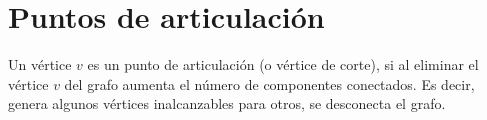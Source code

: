 
\section{Puntos de articulación}\label{articulation-points}
Un vértice \( v \) es un punto de articulación (o vértice de corte), si al eliminar el vértice \( v \) del grafo aumenta el número de componentes conectados. Es decir, genera algunos vértices inalcanzables para otros, se desconecta el grafo.
